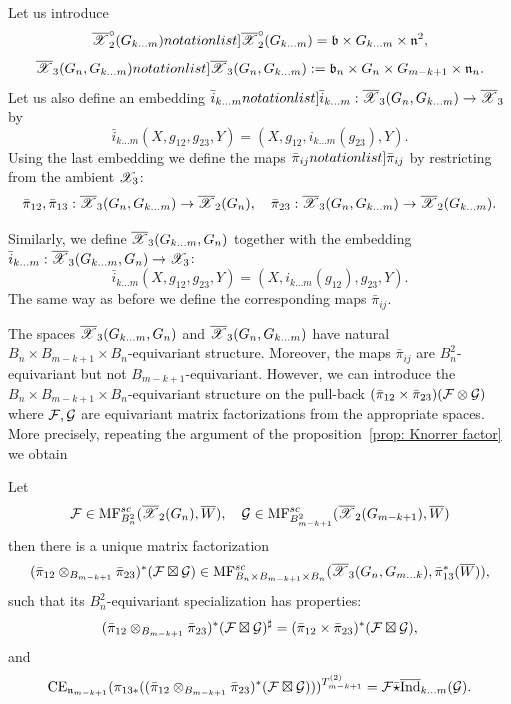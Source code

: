 Let us introduce \[\SymbolPrint{\calXr^{\circ}_2(G_{k\dots m})}=\frb\times G_{k\dots m} \times \frn^2,\]
\[\SymbolPrint{\calXr_3(G_n,G_{k\dots m})}:=\frb_n\times G_n\times G_{m-k+1}\times \frn_n.\] Let us also define an embedding
$\SymbolPrint{\bar{i}_{k\dots m}}:\calXr_3(G_n,G_{k\dots m})\to \calXr_3$ by
$$ \bar{i}_{k\dots m}(X,g_{12},g_{23},Y)=(X,g_{12},i_{k\dots m}(g_{23}),Y).$$  Using the last embedding we define the maps $\SymbolPrint{\bar{\pi}_{ij}}$ by restricting from the ambient $\mathscr{X}_3$:
$$ \bar{\pi}_{12},\bar{\pi}_{13}: \overline{\mathscr{X}}_3(G_n,G_{k\dots m})\to \overline{\mathscr{X}}_2(G_n),\quad \bar{\pi}_{23}: \overline{\mathscr{X}}_3(G_n,G_{k\dots m})\to \overline{\mathscr{X}}_2(G_{k\dots m}).$$

Similarly, we define $\overline{\mathscr{X}}_3(G_{k\dots m},G_n)$ together with the embedding $\bar{i}_{k\dots m}: \overline{\mathscr{X}}_3(G_{k\dots m}, G_n)\to \mathscr{X}_3$:
$$ \bar{i}_{k\dots m}(X,g_{12},g_{23},Y)=(X,i_{k\dots m}(g_{12}),g_{23},Y).$$
The same way as before we define the corresponding maps $\bar{\pi}_{ij}$.

The spaces $\overline{\mathscr{X}}_3(G_{k\dots m},G_n)$ and $\overline{\mathscr{X}}_3(G_n,G_{k\dots m})$ have natural $B_n\times B_{m-k+1}\times B_n$-equivariant structure. Moreover, the maps $\bar{\pi}_{ij}$ are $B_n^2$-equivariant but not $B_{m-k+1}$-equivariant.
However, we can introduce the $B_n\times B_{m-k+1}\times B_n$-equivariant structure on the pull-back $(\bar{\pi}_{12}\times \bar{\pi}_{23})(\mathcal{F}\otimes\mathcal{G})$ where $\mathcal{F},\mathcal{G}$ are equivariant matrix factorizations
from the appropriate spaces. More precisely, repeating the argument of the proposition~\ref{prop: Knorrer factor} we obtain

\begin{proposition}\label{prop: small prod 1}  Let
  \[\mathcal{F}\in \mathrm{MF}^{sc}_{B_n^2}(\overline{\mathscr{X}}_2(G_n),\overline{W}), \quad\mathcal{G}\in \mathrm{MF}^{sc}_{B_{m-k+1}^2}(\overline{\mathscr{X}}_2(G_{m-k+1}),\overline{W})\] then there is a unique matrix factorization
$$(\bar{\pi}_{12}\otimes_{B_{m-k+1}}\bar{\pi}_{23})^*(\mathcal{F}\boxtimes \mathcal{G})\in \mathrm{MF}^{sc}_{B_n\times B_{m-k+1}\times B_n}(\overline{\mathscr{X}}_3(G_n,G_{m\dots k}),\bar{\pi}_{13}^*(\overline{W})),$$
such that its $B_n^2$-equivariant specialization  has properties:
$$(\bar{\pi}_{12}\otimes_{B_{m-k+1}}\bar{\pi}_{23})^*(\mathcal{F}\boxtimes \mathcal{G})^\sharp=(\bar{\pi}_{12}\times\bar{\pi}_{23})^*(\mathcal{F}\boxtimes \mathcal{G}),$$
and
$$\mathrm{CE}_{\mathfrak{n}_{m-k+1}}(\pi_{13*}((\bar{\pi}_{12}\otimes_{B_{m-k+1}}\bar{\pi}_{23})^*(\mathcal{F}\boxtimes \mathcal{G})))^{T_{m-k+1}^{(2)}}=\mathcal{F}\bar{\star}\overline{\mathrm{Ind}}_{k\dots m}(\mathcal{G}).$$
\end{proposition}


